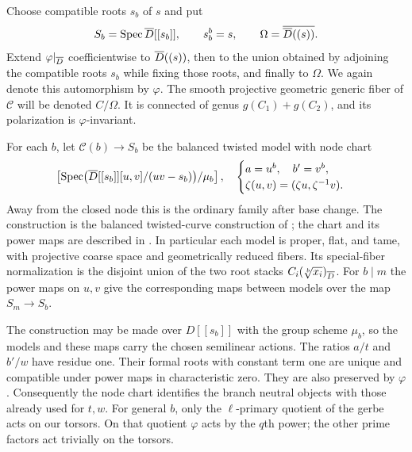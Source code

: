 Choose compatible roots $s_b$ of $s$ and put
\begin{equation}\label{eq:nodal-traits}
 S_b=\operatorname{Spec}\overline D[[s_b]],\qquad s_b^b=s,
 \qquad \Omega=\overline{\overline D((s))}.
\end{equation}
Extend $\varphi|_{\overline D}$ coefficientwise to $\overline D((s))$, then to
the union obtained by adjoining the compatible roots $s_b$ while
fixing those roots, and finally to $\Omega$.  We again denote this
automorphism by $\varphi$.  The smooth projective geometric generic fiber
of $\mathscr C$ will be denoted $C/\Omega$.  It is connected of genus
$g(C_1)+g(C_2)$, and its polarization is $\varphi$-invariant.

For each $b$, let $\mathcal C(b)\to S_b$ be the balanced twisted
model with node chart
\begin{equation}\label{eq:balanced-node}
 \left[\operatorname{Spec}\bigl(\overline D[[s_b]][u,v]/(uv-s_b)\bigr)/\mu_b\right],
 \quad
 \begin{cases}
 a=u^b,\quad b'=v^b,\\
 \zeta(u,v)=(\zeta u,\zeta^{-1}v).
 \end{cases}
\end{equation}
Away from the closed node this is the ordinary family after base
change.  The construction is the balanced twisted-curve construction
of \cite[Theorems~1.9--1.10, Remark~1.11, and
Proposition~2.2(ii)]{OlssonTwisted}; the chart and its power maps are
described in \cite[Section~8.2]{CT}.  In particular each model is
proper, flat, and tame, with projective coarse space and geometrically
reduced fibers.  Its special-fiber normalization is the disjoint
union of the two root stacks $C_i(\sqrt[b]{x_i})_{\overline D}$.
For $b\mid m$ the power maps on $u,v$ give the corresponding maps
between models over the map $S_m\to S_b$.

The construction may be made over $D[[s_b]]$ with the group scheme
$\mu_b$, so the models and these maps carry the chosen semilinear
actions.  The ratios $a/t$ and $b'/w$ have residue one.  Their formal
roots with constant term one are unique and compatible under power
maps in characteristic zero.  They are also preserved by $\varphi$.
Consequently the node chart identifies the branch neutral objects
with those already used for $t,w$.  For general $b$, only the
$\ell$-primary quotient of the gerbe acts on our torsors.  On that
quotient $\varphi$ acts by the $q$th power; the other prime factors
act trivially on the torsors.

